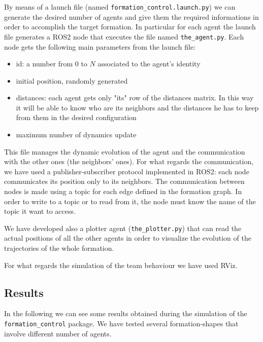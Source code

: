 \documentclass[a4paper,11pt,oneside]{book}
\begin{document}
\bigskip
By means of a launch file (named \texttt{formation\_control.launch.py}) we can generate the desired number of agents and give them the required informations in order to accomplish the target formation. In particular for each agent the launch file generates a ROS2 node that executes the file named \texttt{the\_agent.py}. Each node gets the following main parameters from the launch file:
\begin{itemize}
\item id: a number from $0$ to $N$ associated to the agent's identity
\item initial position, randomly generated
\item distances: each agent gets only "its" row of the distances matrix. In this way it will be able to know who are its neighbors and the distances he has to keep from them in the desired configuration
\item maximum number of dynamics update
\end{itemize}
This file manages the dynamic evolution of the agent and the communication with the other ones (the neighbors' ones). For what regards the communication, we have used a publisher-subscriber protocol implemented in ROS2: each node communicates its position only to its neighbors. The communication between nodes is made using a topic for each edge defined in the formation graph. In order to write to a topic or to read from it, the node must know the name of the topic it want to access.

\bigskip
We have developed also a plotter agent (\texttt{the\_plotter.py}) that can read the actual positions of all the other agents in order to visualize the evolution of the trajectories of the whole formation.

For what regards the simulation of the team behaviour we have used RViz.

\subsection{Results}
In the following we can see some results obtained during the simulation of the \texttt{formation\_control} package. 
We have tested several formation-shapes that involve different number of agents.
\end{document}
